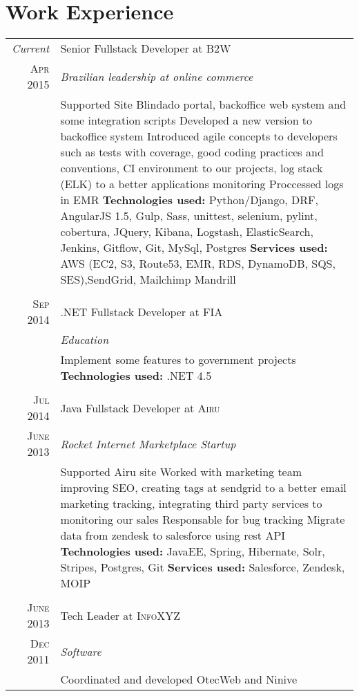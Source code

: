 \documentclass[a4paper,10pt]{article}
\begin{document}
\section{Work Experience}
\begin{tabular}{r|p{11cm}}
 \emph{Current} & Senior Fullstack Developer at \textsc{B2W} \\\textsc{Apr 2015}&\emph{Brazilian leadership at online commerce }\\&\footnotesize{
  Supported Site Blindado portal, backoffice web system and some integration scripts\newline
  Developed a new version to backoffice system\newline
    Introduced agile concepts to developers such as tests with coverage, good coding practices and conventions, CI environment to our projects, log stack (ELK) to a better applications monitoring\newline
    Proccessed logs in EMR\newline    
\textbf{Technologies used:} Python/Django, DRF, AngularJS 1.5, Gulp, Sass, unittest, selenium, pylint, cobertura, JQuery, Kibana, Logstash, ElasticSearch, Jenkins, Gitflow, Git, MySql, Postgres\newline
\textbf{Services used:} AWS (EC2, S3, Route53, EMR, RDS, DynamoDB, SQS, SES),SendGrid, Mailchimp Mandrill}\\\multicolumn{2}{c}{} \\
 \textsc{Sep 2014} & .NET Fullstack Developer at \textsc{FIA} \\&\emph{Education}\\&\footnotesize{Implement some features to government projects\newline
\textbf{Technologies used:} .NET 4.5 
 }\\\multicolumn{2}{c}{} \\
 \textsc{Jul 2014} & Java Fullstack Developer at \textsc{Airu} \\\textsc{June 2013}&\emph{Rocket Internet Marketplace Startup}\\&\footnotesize{ Supported Airu site\newline
    Worked with marketing team improving SEO, creating tags at sendgrid to a better email marketing tracking, integrating third party services to monitoring our sales\newline
    Responsable for bug tracking\newline
    Migrate data from zendesk to salesforce using rest API\newline
\textbf{Technologies used:} JavaEE, Spring, Hibernate, Solr, Stripes, Postgres, Git\newline
\textbf{Services used:} Salesforce, Zendesk, MOIP 
 }\\\multicolumn{2}{c}{} \\
\textsc{June 2013} & Tech Leader at \textsc{InfoXYZ} \\\textsc{Dec 2011}&\emph{Software}\\&\footnotesize{  Coordinated and developed OtecWeb and Ninive\newline

}
\end{tabular}
\end{document}
